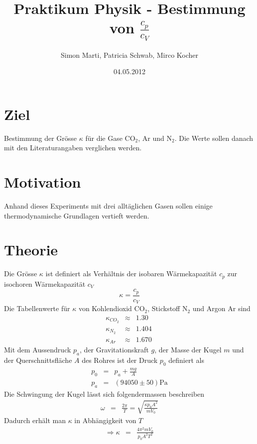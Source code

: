 \documentclass[12pt,a4paper]{article}
\title{Praktikum Physik - Bestimmung von $\frac{c_p}{c_V}$}
\author{Simon Marti, Patricia Schwab, Mirco Kocher}
\date{04.05.2012}
\begin{document}
\maketitle

\section*{Ziel}
Bestimmung der Gr\"osse $\kappa$ f\"ur die Gase CO$_2$, Ar und N$_2$. Die Werte sollen danach mit den Literaturangaben verglichen werden.


\section*{Motivation}
Anhand dieses Experiments mit drei allt\"aglichen Gasen sollen einige thermodynamische Grundlagen vertieft werden.


\section*{Theorie}
Die Gr\"osse $\kappa$ ist definiert als Verh\"altnis der isobaren W\"armekapazit\"at $c_p$ zur isochoren W\"armekapazit\"at $c_V$
\begin{equation}
\kappa = \frac{c_p}{c_V}
\end{equation}
Die Tabellenwerte f\"ur $\kappa$ von Kohlendioxid CO$_2$, Stickstoff N$_2$ und Argon Ar sind
\begin{eqnarray}
\kappa_{CO_2} & \approx & 1.30 \\
\kappa_{N_2} & \approx & 1.404 \\
\kappa_{Ar} & \approx & 1.670 \
\end{eqnarray}
Mit dem Aussendruck $p_a$, der Gravitationskraft $g$, der Masse der Kugel $m$ und der Querschnittsfl\"ache $A$ des Rohres ist der Druck $p_0$ definiert als
\begin{eqnarray}
p_0 & = & p_a + \frac{mg}{A} \label{eq:p}\\
p_a & = & (94050 \pm 50) \mbox{Pa}
\end{eqnarray}
Die Schwingung der Kugel l\"asst sich folgendermassen beschreiben
\begin{eqnarray}
\omega & = & \frac{2\pi}{T} = \sqrt{\frac{\kappa p_0 A^2}{m V_0}}
\end{eqnarray}
Dadurch erh\"alt man $\kappa$ in Abh\"angigkeit von $T$
\begin{eqnarray}
\Rightarrow \kappa & = & \frac{4\pi ^2 m V_0}{p_0 A^2 T^2}\label{eq:k}
\end{eqnarray}
\end{document}
